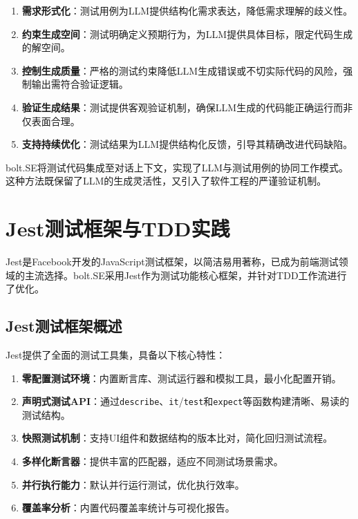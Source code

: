 \begin{enumerate}
  \item \textbf{需求形式化}：测试用例为LLM提供结构化需求表达，降低需求理解的歧义性。
  
  \item \textbf{约束生成空间}：测试明确定义预期行为，为LLM提供具体目标，限定代码生成的解空间。
  
  \item \textbf{控制生成质量}：严格的测试约束降低LLM生成错误或不切实际代码的风险，强制输出需符合验证逻辑。
  
  \item \textbf{验证生成结果}：测试提供客观验证机制，确保LLM生成的代码能正确运行而非仅表面合理。
  
  \item \textbf{支持持续优化}：测试结果为LLM提供结构化反馈，引导其精确改进代码缺陷。
\end{enumerate}

bolt.SE将测试代码集成至对话上下文，实现了LLM与测试用例的协同工作模式。这种方法既保留了LLM的生成灵活性，又引入了软件工程的严谨验证机制。

\section{Jest测试框架与TDD实践}

Jest是Facebook开发的JavaScript测试框架，以简洁易用著称，已成为前端测试领域的主流选择\cite{Jest2023}。bolt.SE采用Jest作为测试功能核心框架，并针对TDD工作流进行了优化。

\subsection{Jest测试框架概述}

Jest提供了全面的测试工具集，具备以下核心特性：

\begin{enumerate}
  \item \textbf{零配置测试环境}：内置断言库、测试运行器和模拟工具，最小化配置开销。
  
  \item \textbf{声明式测试API}：通过\texttt{describe}、\texttt{it}/\texttt{test}和\texttt{expect}等函数构建清晰、易读的测试结构。
  
  \item \textbf{快照测试机制}：支持UI组件和数据结构的版本比对，简化回归测试流程。
  
  \item \textbf{多样化断言器}：提供丰富的匹配器，适应不同测试场景需求。
  
  \item \textbf{并行执行能力}：默认并行运行测试，优化执行效率。
  
  \item \textbf{覆盖率分析}：内置代码覆盖率统计与可视化报告。
\end{enumerate}

